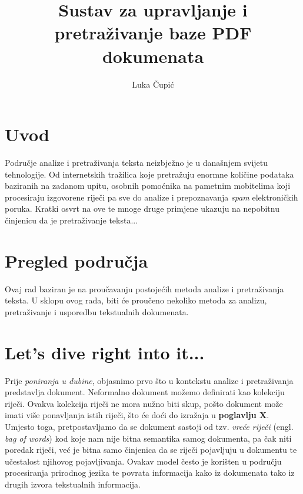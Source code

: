 \documentclass[times, utf8, zavrsni]{fer}
\begin{document}

\title{Sustav za upravljanje i pretraživanje baze PDF dokumenata}

\author{Luka Čupić}

\maketitle

\izvornik

\zahvala{}

\tableofcontents

\chapter{Uvod}
Područje analize i pretraživanja teksta neizbježno je u današnjem svijetu tehnologije. Od internetskih tražilica koje pretražuju enormne količine podataka baziranih na zadanom upitu, osobnih pomoćnika na pametnim mobitelima koji procesiraju izgovorene riječi pa sve do analize i prepoznavanja \textit{spam} elektroničkih poruka.
Kratki osvrt na ove te mnoge druge primjene ukazuju na nepobitnu činjenicu da je pretraživanje teksta...

\chapter{Pregled područja}
Ovaj rad baziran je na proučavanju postojećih metoda analize i pretraživanja teksta. U sklopu ovog rada, biti će proučeno nekoliko metoda za analizu, pretraživanje i usporedbu tekstualnih dokumenata.

\chapter{Let's dive right into it...}
Prije \textit{poniranja u dubine}, objasnimo prvo što u kontekstu analize i pretraživanja predstavlja dokument. Neformalno dokument možemo definirati kao kolekciju riječi. Ovakva kolekcija riječi ne mora nužno biti skup, pošto dokument može imati više ponavljanja istih riječi, što će doći do izražaja u \textbf{poglavlju X}. Umjesto toga, pretpostavljamo da se dokument sastoji od  tzv. \textit{vreće riječi} (engl. \textit{bag of words}) kod koje nam nije bitna semantika samog dokumenta, pa čak niti poredak riječi, već je bitna samo činjenica da se riječi pojavljuju u dokumentu te učestalost njihovog pojavljivanja.
Ovakav model često je korišten u području procesiranja prirodnog jezika te povrata informacija kako iz dokumenata tako iz drugih izvora tekstualnih informacija.
\end{document}
